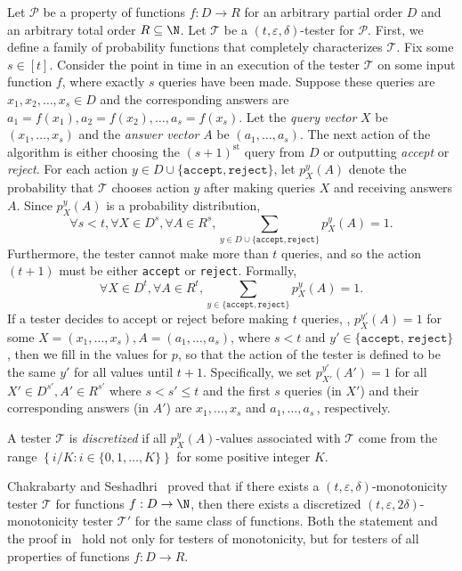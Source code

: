 \documentclass{toc}
\newcommand{\eps}{\varepsilon}
\newcommand{\cP}{\ensuremath{\mathcal{P}}}
\newcommand{\cT}{\ensuremath{\mathcal{T}}}
\begin{document}
Let $\cP$ be a property of functions $f:D \to R$ for an arbitrary partial order $D$ and an arbitrary total order $R \subseteq \N$. Let $\cT$ be a $(t,\eps,\delta)$-tester for $\cP$. First, we define a family of probability functions that completely characterizes $\cT$. Fix some $s \in [t]$. Consider the point in time in an execution of the tester $\cT$ on some input function $f$, where exactly $s$ queries have been made.
Suppose these queries are $x_1, x_2, \ldots, x_s \in D$ and the corresponding answers are $a_1=f(x_1), a_2=f(x_2), \ldots, a_s=f(x_s)$.
Let the \emph{query vector} $X$ be $(x_1, \ldots, x_s)$ and the \emph{answer vector} $A$ be $(a_1, \ldots, a_s)$. The next action of the algorithm is either choosing the ${(s+1)}^\text{st}$ query from $D$ or outputting \emph{accept} or \emph{reject}. For each action $y \in D \cup \{\texttt{accept}, \texttt{reject}\}$, let $p_X^y(A)$ denote the probability that $\cT$ chooses action $y$ after making queries $X$ and receiving answers $A$. Since $p_X^y(A)$ is a probability distribution,
\[\forall s < t, \forall X \in D^s, \forall A \in R^s, \sum_{y \in D \cup \{\texttt{accept}, \texttt{reject} \}} p_X^y(A) = 1.\]
%
Furthermore, the tester cannot make more than $t$ queries,
and so the action $(t+1)$ must be either \texttt{accept} or \texttt{reject}. Formally,
\[\forall X \in D^t, \forall A \in R^t, \sum_{y \in \{\texttt{accept}, \texttt{reject} \}} p_X^y(A) = 1.\]
%
If a tester decides to accept or reject before making $t$ queries, \ie, $p_X^{y'}(A) = 1$ for some $X = (x_1, \ldots, x_s), A=(a_1, \ldots, a_s)$, where $s < t$ and $y' \in \{\texttt{accept, reject}\}$, then
we fill in the values for $p$, so that the action of the tester is defined to be the same $y'$ for all values until $t+1$. Specifically,
 we set $p_{X'}^{y'}(A') = 1$
for all $X' \in D^{s'}, A' \in R^{s'}$ where $s < s' \leq t$ and the first $s$ queries (in $X'$) and their corresponding answers (in $A'$) are $x_1, \ldots, x_s$ and 
$a_1, \ldots, a_s$\,, %
respectively.  %

\begin{definition}  \label{def:disc}
A tester $\cT$ is \emph{discretized} if all $p_X^y(A)$-values associated with $\cT$ come from the range $\left\{ {i}/{K}: i\in \{0,1,\ldots,K\} \right\}$ for some positive integer $K$.
\end{definition}

Chakrabarty and Seshadhri~\cite{CS14} proved that if there exists a $(t,\eps,\delta)$-monotonicity tester $\cT$ for functions $f:D \to \N$, then there exists a discretized $(t,\eps,2\delta)$-monotonicity tester $\cT'$ for the same class of functions.
Both the statement and the proof in~\cite{CS14} hold not only for testers of monotonicity, but for testers of all properties of functions $f:D \to R$.
\end{document}
